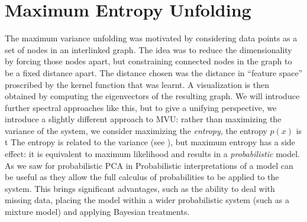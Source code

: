 
\section{Maximum Entropy Unfolding}

The maximum variance unfolding was motivated by considering data points as a set of nodes in an interlinked graph. The idea was to reduce the dimensionality by forcing those nodes apart, but constraining connected nodes in the graph to be a fixed distance apart. The distance chosen was the distance in ``feature space'' proscribed by the kernel function that was learnt. A visualization is then obtained by computing the eigenvectors of the resulting graph. We will introduce further spectral approaches like this, but to give a unifying perspective, we introduce a slightly different approach to MVU: rather than maximizing the variance of the system, we consider maximizing the \emph{\gls{entropy}}, the entropy $p(x)$ is t The entropy is related to the variance (see ), but maximum entropy has a side effect: it is equivalent to maximum likelihood and results in a \emph{probabilistic} model. As we saw for probabilistic PCA in  Probabilistic interpretations of a model can be useful as they allow the full calculus of probabilities to be applied to the system. This brings significant advantages, such as the ability to deal with missing data, placing the model within a wider probabilistic system (such as a mixture model) and applying Bayesian treatments.

